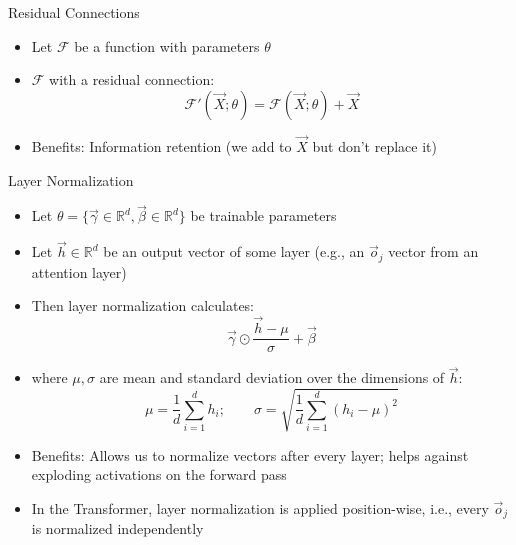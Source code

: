 \begin{vbframe}{Residual Connections}

\vfill

\begin{itemize}
\item Let $\mathcal{F}$ be a function with parameters $\theta$
\item $\mathcal{F}$ with a residual connection:
$$\mathcal{F}'(\vec X; \theta) = \mathcal{F}(\vec X; \theta) + \vec X$$
\begin{center}
\vfill
{}
\end{center}
\item Benefits: Information retention (we add to $\vec X$ but don't replace it)
\end{itemize}

\vfill

\end{vbframe}

\begin{frame}{Layer Normalization}
\footnotesize

\vfill

\begin{itemize}
\item Let $\theta = \{\vec \gamma \in \mathbb{R}^d, \vec \beta \in \mathbb{R}^d\}$ be trainable parameters
\item Let $\vec h \in \mathbb{R}^d$ be an output vector of some layer (e.g., an $\vec o_j$ vector from an attention layer)
\item Then layer normalization calculates:
$$ \vec \gamma \odot \frac{\vec h - \mu}{\sigma} + \vec \beta $$
\item where $\mu, \sigma$ are mean and standard deviation over the dimensions of $\vec h$:
$$ \mu = \frac{1}{d} \sum_{i=1}^d h_{i}; \qquad \sigma = \sqrt{\frac{1}{d} \sum_{i=1}^d (h_i - \mu)^2} $$
\item Benefits: Allows us to normalize vectors after every layer; helps against exploding activations on the forward pass
\item In the Transformer, layer normalization is applied position-wise, i.e., every $\vec o_j$ is normalized independently
\end{itemize}

\vfill

\end{frame}


